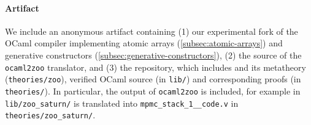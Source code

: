\paragraph{Artifact} We include an anonymous artifact containing (1)
our experimental fork of the OCaml compiler implementing atomic arrays
(\cref{subsec:atomic-arrays}) and generative constructors
(\cref{subsec:generative-constructors}), (2) the source of the
\texttt{ocaml2zoo} translator, and (3) the \Zoo repository, which
includes \ZooLang and its metatheory (\texttt{theories/zoo}), verified
OCaml source (in \texttt{lib/}) and corresponding proofs
(in \texttt{theories/}). In particular, the output of
\texttt{ocaml2zoo} is included, for example 
in \texttt{lib/zoo\_saturn/} is translated into
\texttt{mpmc\_stack\_1\_\_code.v} in \texttt{theories/zoo\_saturn/}.

